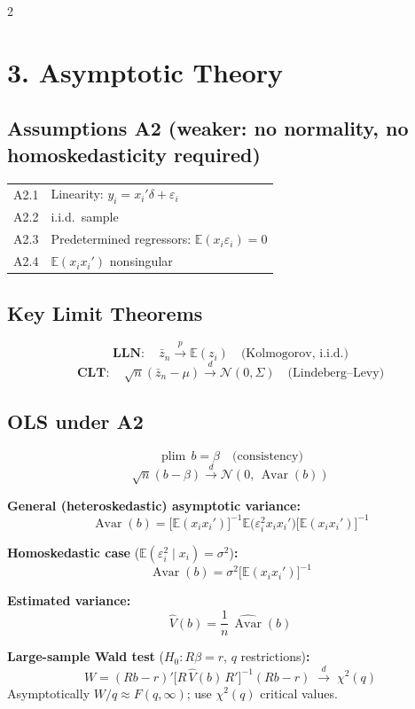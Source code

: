 \documentclass[9pt,a4paper]{article}
\newcommand{\plim}{\operatorname{plim}}
\newcommand{\Avar}{\operatorname{Avar}}
\newcommand{\E}{\mathbb{E}}
\begin{document}
\begin{multicols}{2}
\section{3.\; Asymptotic Theory}

\subsection*{Assumptions A2 (weaker: no normality, no homoskedasticity required)}
\begin{tabular}{@{}lp{5.5cm}@{}}
  A2.1 & Linearity: $y_i = x_i'\delta + \varepsilon_i$ \\
  A2.2 & i.i.d.\ sample \\
  A2.3 & Predetermined regressors: $\E(x_i\varepsilon_i) = 0$ \\
  A2.4 & $\E(x_ix_i')$ nonsingular \\
\end{tabular}

\subsection*{Key Limit Theorems}
\[
  \textbf{LLN}: \quad \bar{z}_n \xrightarrow{p} \E(z_i) \quad \text{(Kolmogorov, i.i.d.)}
\]
\[
  \textbf{CLT}: \quad \sqrt{n}(\bar{z}_n - \mu) \xrightarrow{d} \mathcal{N}(0,\Sigma) \quad\text{(Lindeberg--Levy)}
\]

\subsection*{OLS under A2}
\[
  \plim\, b = \beta \quad\text{(consistency)}
\]
\[
  \sqrt{n}(b-\beta) \xrightarrow{d} \mathcal{N}(0,\,\Avar(b))
\]

\textbf{General (heteroskedastic) asymptotic variance:}
\[
  \Avar(b) = \bigl[\E(x_ix_i')\bigr]^{-1} \E\!\bigl(\varepsilon_i^2 x_ix_i'\bigr) \bigl[\E(x_ix_i')\bigr]^{-1}
\]

\textbf{Homoskedastic case} ($\E(\varepsilon_i^2\mid x_i)=\sigma^2$)\textbf{:}
\[
  \Avar(b) = \sigma^2\bigl[\E(x_ix_i')\bigr]^{-1}
\]

\textbf{Estimated variance:}
\[
  \widehat{V}(b) = \frac{1}{n}\,\widehat{\Avar}(b)
\]

\textbf{Large-sample Wald test} ($H_0\colon R\beta=r$, $q$ restrictions)\textbf{:}
\[
  W = (Rb-r)'\bigl[R\,\widehat{V}(b)\,R'\bigr]^{-1}(Rb-r) \;\xrightarrow{d}\; \chi^2(q)
\]
Asymptotically $W/q \approx F(q,\infty)$; use $\chi^2(q)$ critical values.


\end{multicols}
\end{document}
